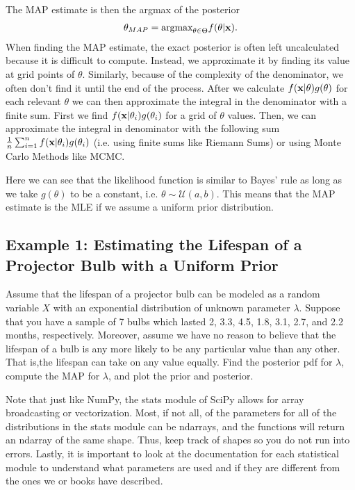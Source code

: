 The MAP estimate is then the argmax of the posterior
\begin{align}\label{eq:map}
  \theta_{MAP} = \mbox{argmax}_{\theta\in\Theta} f(\theta| \mathbf{x}).
\end{align}
When finding the MAP estimate, the exact posterior is often left uncalculated because it is difficult to compute.
Instead, we approximate it by finding its value at grid points of $\theta$.
Similarly, because of the complexity of the denominator, we often don't find it until the end of the process.
After we calculate $f(\mathbf{x} | \theta)g(\theta)$ for each relevant $\theta$ we can then approximate the integral in the denominator with a finite sum.
First we find $f(\mathbf{x} | \theta_i)g(\theta_i)$ for a grid of $\theta$ values.
Then, we can approximate the integral in denominator with the following sum $\frac{1}{n}\sum_{i=1}^n f(\mathbf{x} | \theta_i)g(\theta_i)$ (i.e. using finite sums like Riemann Sums) or using Monte Carlo Methods like MCMC.

Here we can see that the likelihood function is similar to Bayes' rule as long as we take $g(\theta)$ to be a constant, i.e. $\theta\sim \mathcal{U}(a,b)$.
This means that the MAP estimate is the MLE if we assume a uniform prior distribution.

\subsection*{Example 1: Estimating the Lifespan of a Projector Bulb with a Uniform Prior}
Assume that the lifespan of a projector bulb can be modeled as a random variable $X$ with an exponential distribution of unknown parameter $\lambda$.
Suppose that you have a sample of 7 bulbs which lasted
2, 3.3, 4.5, 1.8, 3.1, 2.7, and 2.2 months, respectively. Moreover, assume we have no reason to believe that the lifespan of a bulb is any more likely to be any particular value than any other.
That is,the lifespan can take on any value equally.
Find the posterior pdf for $\lambda$, compute the MAP for $\lambda$, and plot the prior and posterior.

\begin{warn}
    Note that just like NumPy, the stats module of SciPy allows for array broadcasting or vectorization.
    Most, if not all, of the parameters for all of the distributions in the stats module can be ndarrays, and the functions will return an ndarray of the same shape.
    Thus, keep track of shapes so you do not run into errors.
    Lastly, it is important to look at the documentation for each statistical module to understand what parameters are used and if they are different from the ones we or books have described.
\end{warn}


